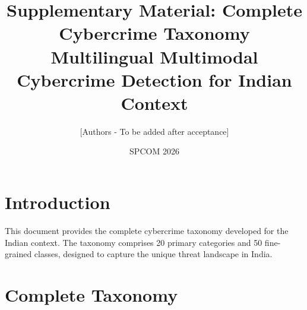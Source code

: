 \documentclass[10pt,a4paper]{article}
\title{Supplementary Material: Complete Cybercrime Taxonomy\\
\large Multilingual Multimodal Cybercrime Detection for Indian Context}
\author{[Authors - To be added after acceptance]}
\date{SPCOM 2026}
\begin{document}
\maketitle

\section{Introduction}

This document provides the complete cybercrime taxonomy developed for the Indian context. The taxonomy comprises 20 primary categories and 50 fine-grained classes, designed to capture the unique threat landscape in India.

\section{Complete Taxonomy}
\end{document}
